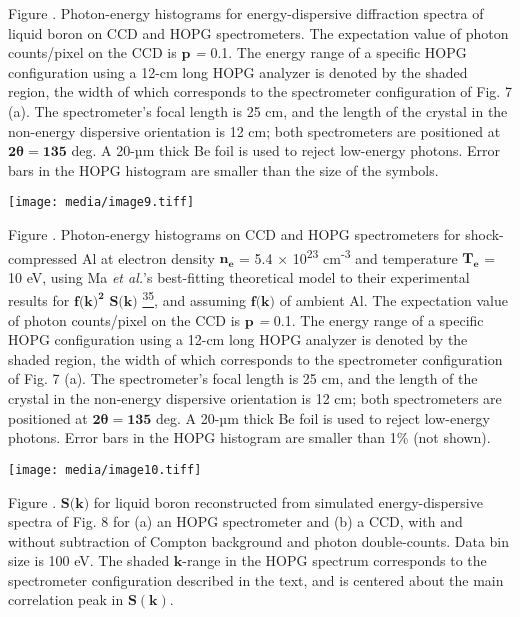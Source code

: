 Figure . Photon-energy histograms for energy-dispersive diffraction
spectra of liquid boron on CCD and HOPG spectrometers. The expectation
value of photon counts/pixel on the CCD is \(\mathbf{p}\) \emph{=} 0.1.
The energy range of a specific HOPG configuration using a 12-cm long
HOPG analyzer is denoted by the shaded region, the width of which
corresponds to the spectrometer configuration of Fig. 7 (a). The
spectrometer's focal length is 25 cm, and the length of the crystal in
the non-energy dispersive orientation is 12 cm; both spectrometers are
positioned at \(\mathbf{2\theta = 135}\) deg. A 20-µm thick Be foil is
used to reject low-energy photons. Error bars in the HOPG histogram are
smaller than the size of the symbols.

\texttt{[image: media/image9.tiff]}

Figure . Photon-energy histograms on
CCD and HOPG spectrometers for shock-compressed Al at electron density
\(\mathbf{n}_{\mathbf{e}}\) = 5.4 × 10\textsuperscript{23}
cm\textsuperscript{-3} and temperature \(\mathbf{T}_{\mathbf{e}}\) = 10
eV, using Ma \emph{et al.}'s best-fitting theoretical model to their
experimental results for
\({\mathbf{f}\mathbf{(}\mathbf{k}\mathbf{)}}^{\mathbf{2}}\)
\(\mathbf{S}\mathbf{(}\mathbf{k}\mathbf{)}\)
\hyperref[t.-ma-et-al.-physical-review-letters-110-065001-2013.]{\textsuperscript{35}},
and assuming \(\mathbf{f}\mathbf{(}\mathbf{k}\mathbf{)}\) of ambient Al.
The expectation value of photon counts/pixel on the CCD is
\(\mathbf{p}\) \emph{=} 0.1. The energy range of a specific HOPG
configuration using a 12-cm long HOPG analyzer is denoted by the shaded
region, the width of which corresponds to the spectrometer configuration
of Fig. 7 (a). The spectrometer's focal length is 25 cm, and the length
of the crystal in the non-energy dispersive orientation is 12 cm; both
spectrometers are positioned at \(\mathbf{2\theta = 135}\) deg. A 20-µm
thick Be foil is used to reject low-energy photons. Error bars in the
HOPG histogram are smaller than 1\% (not shown).

\texttt{[image: media/image10.tiff]}

Figure .
\(\mathbf{S}\mathbf{(}\mathbf{k}\mathbf{)}\) for liquid boron
reconstructed from simulated energy-dispersive spectra of Fig. 8 for (a)
an HOPG spectrometer and (b) a CCD, with and without subtraction of
Compton background and photon double-counts. Data bin size is 100 eV.
The shaded \(\mathbf{k}\)-range in the HOPG spectrum corresponds to the
spectrometer configuration described in the text, and is centered about
the main correlation peak in \(\mathbf{S(k)}\).

